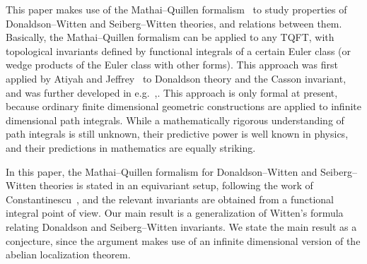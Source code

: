 \documentclass[a4paper,12pt,reqno,sumlimits]{amsart}
\theoremstyle{plain}
\theoremstyle{definition}
\newcommand{\1}{{\bf 1}}
\numberwithin{equation}{section}
\begin{document}
This paper makes use of the Mathai--Quillen formalism~\cite{mq} to study
properties of Donaldson--Witten and Seiberg--Witten theories, and relations
between them. Basically, the Mathai--Quillen formalism can be applied to any
TQFT, with topological invariants defined by functional integrals of a
certain Euler class (or wedge products of the Euler class with other forms).
This approach was first applied by Atiyah and Jeffrey~\cite{aj} to Donaldson
theory and the Casson invariant, and was further developed in
e.g.~\cite{radu},\cite{wu}.  This approach is only formal at present, because
ordinary finite dimensional geometric constructions are applied to infinite
dimensional path integrals.  While a mathematically rigorous understanding of
path integrals is still unknown, their predictive power is well known in
physics, and their predictions in mathematics are equally striking.

In this paper, the Mathai--Quillen formalism for Donaldson--Witten and
Seiberg--Witten theories is stated in an equivariant setup, following the
work of Constantinescu~\cite{radu}, and the relevant invariants are obtained
from a functional integral point of view. Our main result is a generalization
of Witten's formula relating Donaldson and Seiberg--Witten invariants. We
state the main result as a conjecture, since the argument makes use of an
infinite dimensional version of the abelian localization theorem.
\end{document}
